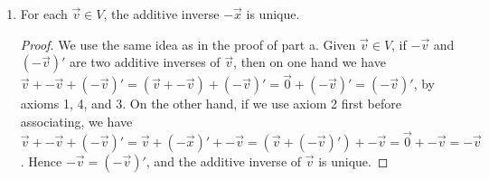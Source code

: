 \documentclass[11pt,fleqn]{book} %
\begin{document}
\begin{proposition}
\begin{enumerate}[label=\alph*)]
\begin{proof}
            Pick $\overrightarrow{v} \in V$. 
            \begin{align*}
                \underset{\mathbb{F}}{0}\overrightarrow{v} 
                &= (\underset{\mathbb{F}}{0} + \underset{\mathbb{F}}{0})\overrightarrow{v} 
                \\
                &= \underset{\mathbb{F}}{0}\overrightarrow{v} + \underset{\mathbb{F}}{0}\overrightarrow{v}
                \\
                (-\underset{\mathbb{F}}{0}\overrightarrow{v}) + \underset{\mathbb{F}}{0}\overrightarrow{v}
                &= (-\underset{\mathbb{F}}{0}\overrightarrow{v}) + (\underset{\mathbb{F}}{0}\overrightarrow{v} + \underset{\mathbb{F}}{0}\overrightarrow{v})
                \\
                -\underset{\mathbb{F}}{0}\overrightarrow{v} + \underset{\mathbb{F}}{0}\overrightarrow{v}
                &= (-\underset{\mathbb{F}}{0}\overrightarrow{v} + \underset{\mathbb{F}}{0}\overrightarrow{v}) + \underset{\mathbb{F}}{0}\overrightarrow{v}
                \\
                \overrightarrow{0_V}
                &=
                \overrightarrow{0_V} + \underset{\mathbb{F}}{0}\overrightarrow{v}
                \\
                &=\underset{\mathbb{F}}{0}\overrightarrow{v}
            \end{align*}
            
            Thus, $\forall \overrightarrow{x} \in V$, $\underset{\mathbb{F}}{0}\overrightarrow{v} = \overrightarrow{0_V}$. 
        \end{proof}

        \item For each $\overrightarrow{v} \in V$, the additive inverse $-\overrightarrow{x}$ is unique.

        \begin{proof}
            We use the same idea as in the proof of part a. Given $\overrightarrow{v} \in V$, if $-\overrightarrow{v}$ and $(-\overrightarrow{v})'$ are two additive inverses of $\overrightarrow{v}$, then on one hand we have $\overrightarrow{v} + -\overrightarrow{v}  + (-\overrightarrow{v})' = (\overrightarrow{v} + -\overrightarrow{v}) + (-\overrightarrow{v})' = \overrightarrow{0} + (-\overrightarrow{v})' = (-\overrightarrow{v})'$, by axioms 1, 4, and 3. On the other hand, if we use axiom 2 first before associating, we have $\overrightarrow{v} + -\overrightarrow{v}  + (-\overrightarrow{v})' = \overrightarrow{v} + (-\overrightarrow{x})' + -\overrightarrow{v} = (\overrightarrow{v} + (-\overrightarrow{v})') + -\overrightarrow{v} = \overrightarrow{0} + -\overrightarrow{v} = -\overrightarrow{v}$. Hence $-\overrightarrow{v} = (-\overrightarrow{v})'$, and the additive inverse of $\overrightarrow{v}$ is unique.
        \end{proof}
        

\end{enumerate}
\end{proposition}
\end{document}
